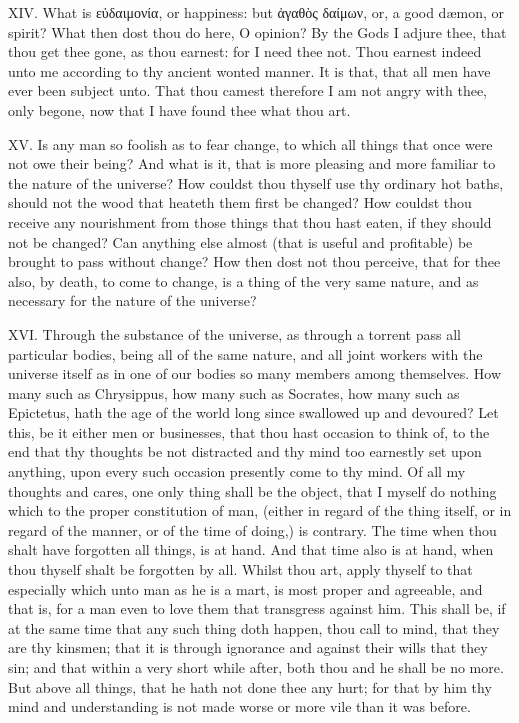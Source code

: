 XIV. What is
εὐδαιμονία, or
happiness: but ἀγαθὸς
δαίμων, or, a good dæmon, or spirit? What
then dost thou do here, O opinion? By the Gods I adjure thee, that thou
get thee gone, as thou earnest: for I need thee not. Thou earnest indeed
unto me according to thy ancient wonted manner. It is that, that all men
have ever been subject unto. That thou camest therefore I am not angry
with thee, only begone, now that I have found thee what thou art.

XV. Is any man so foolish as to fear change, to which all things that
once were not owe their being? And what is it, that is more pleasing and
more familiar to the nature of the universe? How couldst thou thyself use
thy ordinary hot baths, should not the wood that heateth them first be
changed? How couldst thou receive any nourishment from those things that
thou hast eaten, if they should not be changed? Can anything else almost
(that is useful and profitable) be brought to pass without change? How
then dost not thou perceive, that for thee also, by death, to come to
change, is a thing of the very same nature, and as necessary for the
nature of the universe?

XVI. Through the substance of the universe, as through a torrent pass
all particular bodies, being all of the same nature, and all joint workers
with the universe itself as in one of our bodies so many members among
themselves. How many such as Chrysippus, how many such as Socrates, how
many such as Epictetus, hath the age of the world long since swallowed up
and devoured? Let this, be it either men or businesses, that thou hast
occasion to think of, to the end that thy thoughts be not distracted and
thy mind too earnestly set upon anything, upon every such occasion
presently come to thy mind. Of all my thoughts and cares, one only thing
shall be the object, that I myself do nothing which to the proper
constitution of man, (either in regard of the thing itself, or in regard
of the manner, or of the time of doing,) is contrary. The time when thou
shalt have forgotten all things, is at hand. And that time also is at
hand, when thou thyself shalt be forgotten by all. Whilst thou art, apply
thyself to that especially which unto man as he is a mart, is most proper
and agreeable, and that is, for a man even to love them that transgress
against him. This shall be, if at the same time that any such thing doth
happen, thou call to mind, that they are thy kinsmen; that it is through
ignorance and against their wills that they sin; and that within a very
short while after, both thou and he shall be no more. But above all
things, that he hath not done thee any hurt; for that by him thy mind and
understanding is not made worse or more vile than it was before.

